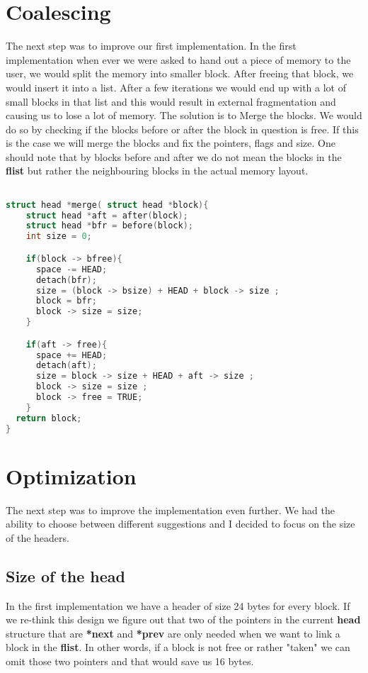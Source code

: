 \documentclass[a4paper,10pt]{article}
\begin{document}
\section*{Coalescing}
The next step was to improve our first implementation. In the first implementation when ever we were asked to hand out a piece of memory to the user, we would split the memory into smaller block. After freeing that block, we would insert it into a list. After a few iterations we would end up with a lot of small blocks in that list and this would result in external fragmentation and causing us to lose a lot of memory.
The solution is to Merge the blocks. We would do so by checking if the blocks before or after the block in question is free. If this is the case we will merge the blocks and fix the pointers, flags and size. One should note that by blocks before and after we do not mean the blocks in the \textbf{flist} but rather the neighbouring blocks in the actual memory layout.

\begin{lstlisting}[language=C]

struct head *merge( struct head *block){
    struct head *aft = after(block);
    struct head *bfr = before(block);
    int size = 0;

    if(block -> bfree){
      space -= HEAD;
      detach(bfr);
      size = (block -> bsize) + HEAD + block -> size ;
      block = bfr;
      block -> size = size;
    }

    if(aft -> free){
      space += HEAD;
      detach(aft);
      size = block -> size + HEAD + aft -> size ;
      block -> size = size ;
      block -> free = TRUE;
    }
  return block;
}
\end{lstlisting}
\vspace{5mm}
\section*{Optimization}
The next step was to improve the implementation even further. We had the ability to choose between different suggestions and I decided to focus on the size of the headers.
\subsection*{Size of the head}
In the first implementation we have a header of size 24 bytes for every block. If we re-think this design we figure out that two of the pointers in the current \textbf{head} structure that are \textbf{*next} and \textbf{*prev} are only needed when we want to link a block in the \textbf{flist}. In other words, if a block is not free or rather "taken" we can omit those two pointers and that would save us 16 bytes.
\vspace{5mm}
\end{document}
